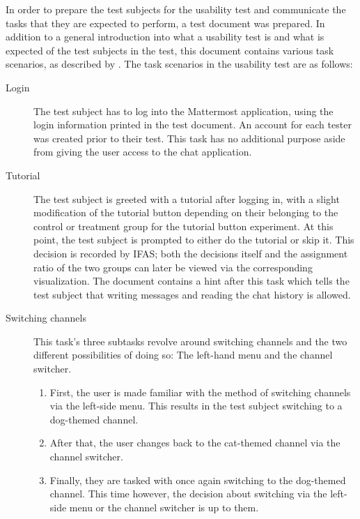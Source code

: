 In order to prepare the test subjects for the usability test and communicate the tasks that they are expected to perform, a test document was prepared.
In addition to a general introduction into what a usability test is and what is expected of the test subjects in the test, this document contains various task scenarios, as described by \citet[Prepare Test Materials, pp.~182f]{rubin2008handbook}.
The task scenarios in the usability test are as follows:

\begin{description}

\item [Login] The test subject has to log into the Mattermost application, using the login information printed in the test document.
An account for each tester was created prior to their test.
This task has no additional purpose aside from giving the user access to the chat application.

\item [Tutorial] The test subject is greeted with a tutorial after logging in, with a slight modification of the tutorial button depending on their belonging to the control or treatment group for the tutorial button experiment.
At this point, the test subject is prompted to either do the tutorial or skip it.
This decision is recorded by \ac{IFAS}; both the decisions itself and the assignment ratio of the two groups can later be viewed via the corresponding visualization.
The document contains a hint after this task which tells the test subject that writing messages and reading the chat history is allowed.

\item [Switching channels] This task's three subtasks revolve around switching channels and the two different possibilities of doing so: The left-hand menu and the channel switcher.

\begin{enumerate}
\item First, the user is made familiar with the method of switching channels via the left-side menu.
This results in the test subject switching to a dog-themed channel.
\item After that, the user changes back to the cat-themed channel via the channel switcher.
\item Finally, they are tasked with once again switching to the dog-themed channel.
This time however, the decision about switching via the left-side menu or the channel switcher is up to them.
\end{enumerate}


\end{description}
